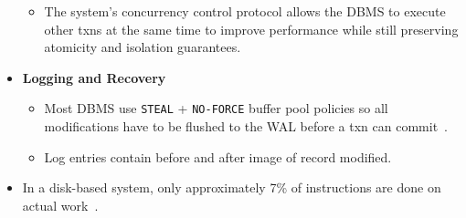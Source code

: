 \documentclass[11pt]{article}
\begin{document}
\begin{itemize}
\begin{itemize}
        \item
        The system's concurrency control protocol allows the DBMS to execute other txns at the same 
        time to improve performance while still preserving atomicity and isolation guarantees.
    \end{itemize}
    
    \item \textbf{Logging and Recovery}
    \begin{itemize}
        \item
        Most DBMS use \texttt{STEAL} + \texttt{NO-FORCE} buffer pool policies so all modifications 
        have to be flushed to the WAL before a txn can commit~\cite{franklin14}.
        
        \item
        Log entries contain before and after image of record modified.
    \end{itemize}

    \item
    In a disk-based system, only approximately 7\% of instructions are done on actual 
    work~\cite{harizopoulos08}.
    
\end{itemize}
\end{document}
